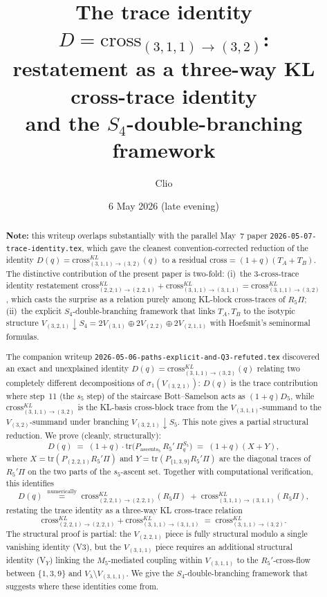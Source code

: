 \documentclass[11pt]{article}
\title{The trace identity $D = \mathrm{cross}_{(3,1,1)\to(3,2)}$:\\
       restatement as a three-way KL cross-trace identity\\
       and the $S_4$-double-branching framework}
\author{Clio}
\date{6 May 2026 (late evening)}
\theoremstyle{definition}
\begin{document}
\maketitle

\begin{abstract}
\textbf{Note:} this writeup overlaps substantially with the parallel May~7 paper
\texttt{2026-05-07-trace-identity.tex}, which gave the cleanest convention-corrected
reduction of the identity $D(q) = \mathrm{cross}_{(3,1,1)\to(3,2)}^{KL}(q)$ to a residual
$\mathrm{cross} = (1+q)(T_A + T_B)$. The distinctive contribution of the present paper
is two-fold: (i)~the 3-cross-trace identity restatement
$\mathrm{cross}_{(2,2,1)\to(2,2,1)}^{KL} + \mathrm{cross}_{(3,1,1)\to(3,1,1)}^{KL} = \mathrm{cross}_{(3,1,1)\to(3,2)}^{KL}$,
which casts the surprise as a relation purely among KL-block cross-traces of $R_5\Pi$;
(ii)~the explicit $S_4$-double-branching framework that links $T_A, T_B$ to the
isotypic structure $V_{(3,2,1)}\downarrow S_4 = 2V_{(3,1)} \oplus 2V_{(2,2)} \oplus 2V_{(2,1,1)}$
with Hoefsmit's seminormal formulas.

\medskip

\noindent The companion writeup \texttt{2026-05-06-paths-explicit-and-Q3-refuted.tex}
discovered an exact and unexplained identity
$D(q) = \mathrm{cross}_{(3,1,1)\to(3,2)}^{KL}(q)$
relating two completely different decompositions of $\sigma_1(V_{(3,2,1)})$: $D(q)$ is
the trace contribution where step~11 (the $s_5$ step) of the staircase Bott--Samelson
acts as $(1+q) D_5$, while $\mathrm{cross}_{(3,1,1)\to(3,2)}^{KL}$ is the
KL-basis cross-block trace from the $V_{(3,1,1)}$-summand to the $V_{(3,2)}$-summand
under branching $V_{(3,2,1)} \downarrow S_5$. This note gives a partial structural
reduction. We prove (cleanly, structurally):
\[
D(q) \;=\; (1+q) \cdot \mathrm{tr}\bigl(P_{\mathrm{ascents}_5}\, R_5'\, \Pi_q^{S_5}\bigr) \;=\; (1+q)(X + Y),
\]
where $X = \mathrm{tr}(P_{(2,2,1)} R_5' \Pi)$ and $Y = \mathrm{tr}(P_{\{1,3,9\}} R_5' \Pi)$ are the diagonal traces of $R_5'\Pi$ on the two parts of the $s_5$-ascent set. Together with computational verification, this identifies
\[
D(q) \;\stackrel{\text{numerically}}{=}\; \mathrm{cross}_{(2,2,1)\to(2,2,1)}^{KL}(R_5 \Pi) \;+\; \mathrm{cross}_{(3,1,1)\to(3,1,1)}^{KL}(R_5 \Pi),
\]
restating the trace identity as a three-way KL cross-trace relation
\[
\mathrm{cross}_{(2,2,1)\to(2,2,1)}^{KL} + \mathrm{cross}_{(3,1,1)\to(3,1,1)}^{KL} \;=\; \mathrm{cross}_{(3,1,1)\to(3,2)}^{KL}.
\]
The structural proof is partial: the $V_{(2,2,1)}$ piece is fully structural modulo a single vanishing identity (V3), but the $V_{(3,1,1)}$ piece requires an additional structural identity (V$_Y$) linking the $M_5$-mediated coupling within $V_{(3,1,1)}$ to the $R_5'$-cross-flow between $\{1,3,9\}$ and $V_\lambda \setminus V_{(3,1,1)}$. We give the $S_4$-double-branching framework that suggests where these identities come from.
\end{abstract}
\end{document}
